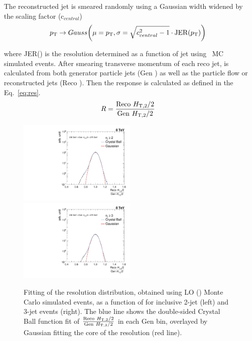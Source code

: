 The reconstructed jet \pt is smeared randomly using a Gaussian width widened by the scaling factor (c$_{central}$) 
\begin{equation}
p_{\mathrm{T}} \rightarrow Gauss\bigg(\mu = p_{\mathrm{T}}, \sigma = \sqrt{c^2_{central} - 1} \cdot {\rm JER}(p_{\mathrm{T}})\bigg)
\end{equation}

where JER(\pt) is the resolution determined as a function of jet \pt using \MGP~MC simulated events. After smearing transverse momentum of each reco jet, \httwo is calculated from both generator particle jets (Gen \httwons) as well as the particle flow or reconstructed jets (Reco \httwons). Then the response is calculated as defined in the Eq.~\ref{eq:res}. 
\begin{equation}
\label{eq:res}
  R = \frac{{\rm Reco}~\httwo}{{\rm Gen}~\httwo}
\end{equation}

\begin{figure}[ht]
 \begin{center}
 \hspace*{-5mm}\includegraphics[width=0.51\textwidth]{Plots_HT_2_150/Fit_Res_2_final_crystal_genbin_250-275_crystal_nomet.pdf}%
 ~~\includegraphics[width=0.51\textwidth]{Plots_HT_2_150/Fit_Res_3_final_crystal_genbin_250-275_crystal_nomet.pdf}
 \caption[]{Fitting of the resolution distribution, obtained using LO \MadGraphFn\plusn \PYTHIAS (\MGP) Monte Carlo simulated events, as a function of \httwo for inclusive 2-jet (left) and 3-jet events (right). The blue line shows the double-sided Crystal Ball function fit of $\frac{{\rm Reco}~\httwo}{{\rm Gen}~\httwo}$ in each Gen \httwo bin, overlayed by Gaussian fitting the core of the resolution (red line).}
 \label{fig:fit_gauss}
 \end{center}
\end{figure}


